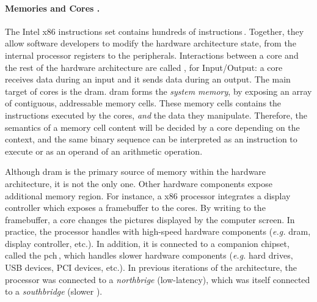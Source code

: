 \paragraph{Memories and Cores \IOs.}
%
The Intel x86 instructions set contains hundreds of instructions\,\cite[Volume
2]{intel2014manual}.
%
Together, they allow software developers to modify the hardware architecture
state, from the internal processor registers to the peripherals.
%
Interactions between a core and the rest of the hardware architecture are called
\IOs, for Input/Output: a core receives data during an input and it sends data
during an output.
%
The main target of cores \IOs is the \ac{dram}.
%
\ac{dram} forms the \emph{system memory}, by exposing an array of contiguous,
addressable memory cells.
%
These memory cells contains the instructions executed by the cores, \emph{and}
the data they manipulate.
%
Therefore, the semantics of a memory cell content will be decided by a core
depending on the context, and the same binary sequence can be interpreted as an
instruction to execute or as an operand of an arithmetic operation.

Although \ac{dram} is the primary source of memory within the hardware
architecture, it is not the only one.
%
Other hardware components expose additional memory region.
%
For instance, a x86 processor integrates a display controller which exposes a
framebuffer to the cores.
%
By writing to the framebuffer, a core changes the pictures displayed by the
computer screen.
%
In practice, the processor handles \IOs with high-speed hardware components
(\emph{e.g.} \ac{dram}, display controller, etc.).
%
In addition, it is connected to a companion chipset, called the
\ac{pch}\,\cite{turley2014introx86}, which handles slower hardware components
(\emph{e.g.}  hard drives, USB devices, PCI devices, etc.).
%
In previous iterations of the architecture, the processor was connected to a
\emph{northbrige} (low-latency), which was itself connected to a
\emph{southbridge} (slower \IOs).

